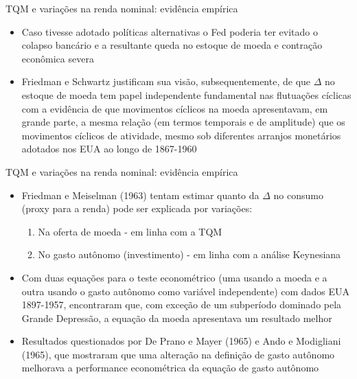 \documentclass[10pt]{beamer}
\begin{document}
\begin{frame}{TQM e variações na renda nominal: evidência empírica}
    \begin{itemize}
        \item Caso tivesse adotado políticas alternativas o Fed poderia ter evitado o colapso bancário e a resultante queda no estoque de moeda e contração econômica severa
        \bigskip
        \item Friedman e Schwartz justificam sua visão, subsequentemente, de que $\Delta$ no estoque de moeda tem papel independente fundamental nas flutuações cíclicas com a evidência de que movimentos cíclicos na moeda apresentavam, em grande parte, a mesma relação (em termos temporais e de amplitude) que os movimentos cíclicos de atividade, mesmo sob diferentes arranjos monetários adotados nos EUA ao longo de 1867-1960
    \end{itemize}
\end{frame}

\begin{frame}{TQM e variações na renda nominal: evidência empírica}
    \begin{itemize}
        \item Friedman e Meiselman (1963) tentam estimar quanto da $\Delta$ no consumo (proxy para a renda) pode ser explicada por variações:
        \bigskip
        \begin{enumerate}
            \item Na oferta de moeda - em linha com a TQM
            \bigskip
            \item No gasto autônomo (investimento) - em linha com a análise Keynesiana
        \end{enumerate}
        \bigskip
        \item Com duas equações para o teste econométrico (uma usando a moeda e a outra usando o gasto autônomo como variável independente) com dados EUA 1897-1957, encontraram que, com exceção de um subperíodo dominado pela Grande Depressão, a equação da moeda apresentava um resultado melhor
        \bigskip
        \item Resultados questionados por De Prano e Mayer (1965) e Ando e Modigliani (1965), que mostraram que uma alteração na definição de gasto autônomo melhorava a performance econométrica da equação de gasto autônomo
    \end{itemize}
\end{frame}
\end{document}
